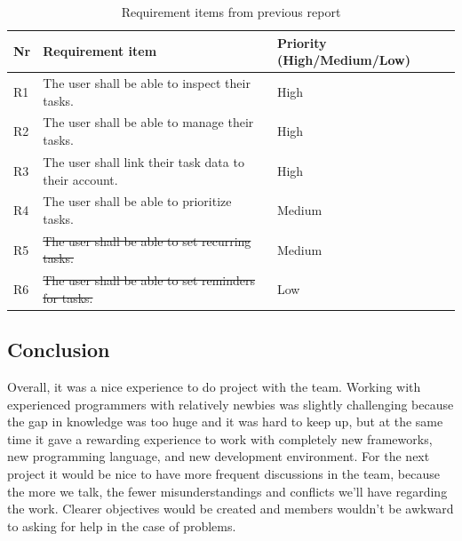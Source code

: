 \documentclass{article}
\begin{document}
\begin{table}[H]
  \centering
  \begin{tabularx}{\textwidth}{|l|X|l|}
    \toprule
    \textbf{Nr} & \textbf{Requirement item}                             & \textbf{Priority (High/Medium/Low)} \\
    \hline
    R1          & The user shall be able to inspect their tasks.        & High                                \\
    \hline
    R2          & The user shall be able to manage their tasks.         & High                                \\
    \hline
    R3          & The user shall link their task data to their account. & High                                \\
    \hline
    R4          & The user shall be able to prioritize tasks.           & Medium                              \\
    \hline
    R5          & \sout{The user shall be able to set recurring tasks.}        & Medium                              \\
    \hline
    R6          & \sout{The user shall be able to set reminders for tasks.}    & Low                                 \\
    \bottomrule
  \end{tabularx}
  \caption{Requirement items from previous report}
  \label{Requirement items from previous report}
\end{table}

\subsection{Conclusion}
Overall, it was a nice experience to do project with the team. Working with experienced programmers with relatively newbies was slightly challenging because the gap in knowledge was too huge and it was hard to keep up, but at the same time it gave a rewarding experience to work with completely new frameworks, new programming language, and new development environment.
For the next project it would be nice to have more frequent discussions in the team, because the more we talk, the fewer misunderstandings and conflicts we’ll have regarding the work. Clearer objectives would be created and members wouldn't be awkward to asking for help in the case of problems. 


\end{document}
